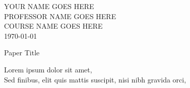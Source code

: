 \documentclass[12pt,letterpaper]{article}
\renewcommand{\maketitle}{\makemlaheader}
\newcommand{\C}{\autocite}
\newcommand{\makemlaheader}{
YOUR NAME GOES HERE \\
PROFESSOR NAME GOES HERE\\
COURSE NAME GOES HERE\\
\today\\
\begin{center}\textnormal{Paper Title}\end{center}

}
\begin{document}
\begin{flushleft}


\maketitle





Lorem ipsum dolor sit amet, \C{Kavanaugh1976} \\

Sed finibus, elit quis mattis suscipit, nisi nibh gravida orci, \C{Saussure1995}


\newpage

\printbibliography


\end{flushleft}
\end{document}
